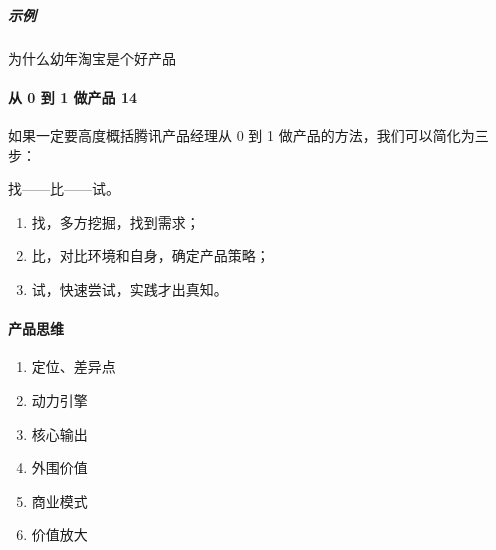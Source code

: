 \documentclass[letterpaper,10pt,english]{sphinxmanual}
\begin{document}
\subparagraph{示例}
\label{\detokenize{chapter_introduction/Product:id13}}
为什么幼年淘宝是个好产品
%
\begin{footnote}[45]\sphinxAtStartFootnote
{}
%
\end{footnote}


\paragraph{从 0 到 1 做产品 14\sphinxfootnotemark[46]}
\label{\detokenize{chapter_introduction/Product:id14}}%
\begin{footnotetext}[46]\sphinxAtStartFootnote
{}
%
\end{footnotetext}\ignorespaces 
如果一定要高度概括腾讯产品经理从 0 到 1
做产品的方法，我们可以简化为三步：

找——比——试。
\begin{enumerate}
%
\item {} 
找，多方挖掘，找到需求；

\item {} 
比，对比环境和自身，确定产品策略；

\item {} 
试，快速尝试，实践才出真知。

\end{enumerate}


\paragraph{产品思维}
\label{\detokenize{chapter_introduction/Product:id15}}\begin{enumerate}
%
\item {} 
定位、差异点

\item {} 
动力引擎

\item {} 
核心输出

\item {} 
外围价值

\item {} 
商业模式

\item {} 
价值放大

\end{enumerate}
\end{document}

